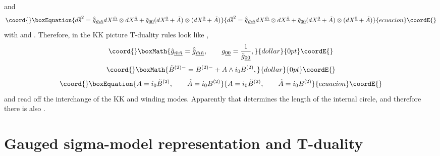 \documentclass[a4paper,11pt]{article}
\begin{document}
and
\begin{equation}\coord{}\boxEquation{\plabel{intdua}
d\overline{\tilde s}^2=
\hat{\tilde g}_{\underline{\tilde m}\underline{\tilde n}}
dX^{\underline{\tilde m}}\otimes dX^{\underline{\tilde n}}
+\tilde{g}_{\underline{00}}
(dX^{\underline{0}}+\tilde{A})\otimes (dX^{\underline{0}}+\tilde{A})
}{d\overline{\tilde s}^2=
\hat{\tilde g}_{\underline{\tilde m}\underline{\tilde n}}
dX^{\underline{\tilde m}}\otimes dX^{\underline{\tilde n}}
+\tilde{g}_{\underline{00}}
(dX^{\underline{0}}+\tilde{A})\otimes (dX^{\underline{0}}+\tilde{A})
}{ecuacion}\coordE{}\end{equation}
with \coordHE{} and \coordHE{}. Therefore, in the KK picture T-duality rules
look like \cite{bko}, \cite{clps}
$$\coord{}\boxMath{
\hat{g}_{\underline{\tilde m}\underline{\tilde n}}=
\hat{\tilde g}_{\underline{\tilde m}\underline{\tilde n}},\qquad
g_{\underline{00}}={1\over {\tilde g}_{\underline{00}}},
}{dollar}{0pt}\coordE{}$$  $$\coord{}\boxMath{
{\tilde B}^{(2)-}=B^{(2)-}+A\wedge i_0 B^{(2)},
}{dollar}{0pt}\coordE{}$$
\begin{equation}\coord{}\boxEquation{\plabel{TRBKK}
A=i_0 \tilde{B}^{(2)},\qquad \tilde{A}=i_0 B^{(2)}
}{A=i_0 \tilde{B}^{(2)},\qquad \tilde{A}=i_0 B^{(2)}
}{ecuacion}\coordE{}\end{equation}
and read off the interchange of the KK and winding modes. Apparently that
\coordHE{} determines the length of the internal circle, and
therefore there is also \coordHE{}.


\section{Gauged sigma-model representation and T-duality}
\end{document}

